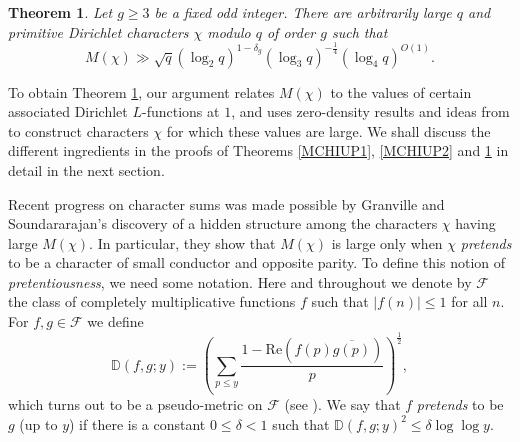 \documentclass[12pt]{amsart}
\newtheorem{thm}{Theorem}[section]
\theoremstyle{definition}
\numberwithin{equation}{section}
\newcommand{\mb}{\mathbb}
\newcommand{\mc}{\mathcal}
\renewcommand{\bar}{\overline}
\begin{document}
\begin{thm} \label{MCHILOW}
Let $g\geq 3$ be a fixed odd integer. There are arbitrarily large $q$ and primitive Dirichlet characters $\chi$ modulo $q$ of order $g$ such that
\begin{equation} \label{PREC1}
M(\chi)  \gg \sqrt{q} \left(\log_2 q\right)^{1-\delta_g}  \left(\log_3 q\right)^{-\frac{1}{4}}\left(\log_4 q\right)^{O(1)}.
\end{equation}
\end{thm}

To obtain Theorem \ref{MCHILOW}, our argument relates $M(\chi)$ to the values of certain associated Dirichlet $L$-functions at $1$, and uses zero-density results and ideas from \cite{LAM} to construct characters $\chi$ for which these values are large. We shall discuss the different ingredients in the proofs of Theorems \ref{MCHIUP1}, \ref{MCHIUP2}  and \ref{MCHILOW} in detail in the next section. 
 
Recent progress on character sums was made possible by Granville and Soundararajan's discovery of a hidden structure among the characters $\chi$ having large $M(\chi)$. In particular, they show that $M(\chi)$ is large only when $\chi$ \emph{pretends} to be a character of small conductor and opposite parity. To define this notion of \emph{pretentiousness}, we need some notation.  Here and throughout we denote by $\mathcal{F}$ the class of completely multiplicative functions $f$ such that $|f(n)|\leq 1$ for all $n$. For $f, g\in \mc{F}$ we define
\begin{equation*}
\mb{D}(f,g;y) := \left(\sum_{p \leq y} \frac{1-\text{Re}(f(p)\bar{g(p)})}{p}\right)^{\frac{1}{2}},
\end{equation*}
which turns out to be a pseudo-metric on $\mc{F}$ (see \cite{GrSo2}). 
We say that $f$ \emph{pretends} to be $g$ (up to $y$) if there is a constant $0\leq \delta<1$ such that $\mb{D}(f,g;y)^2\leq \delta \log\log  y$. 
\end{document}
